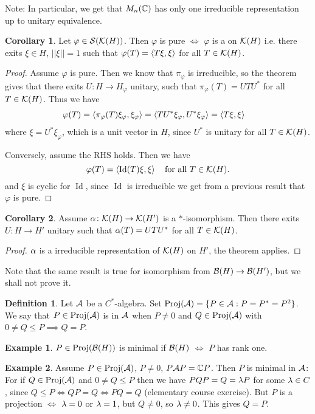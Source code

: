 \documentclass[10pt,english,a4paper]{article}
\theoremstyle{definition}
\newtheorem*{definition}{Definition}
\newtheorem*{corollary}{Corollary}
\newtheorem*{example}{Example}
\let\emph\relax %
\def\pivp{\pi_{\vphi}}
\def\Hvp{H_{\vphi}}
\def\xivp{\xi_{\vphi}}
\DeclareMathOperator{\Proj}{Proj}
\DeclareMathOperator{\Id}{Id}
\def\vphi{\varphi}
\begin{document}
Note: In particular, we get that $M_n(\mathbb{C})$ has only one irreducible representation 
up to unitary equivalence. 


\begin{corollary}
    Let $\varphi \in \mathcal{S}(\mathcal{K}(H))$. Then $\vphi$ is pure $\iff$ $\vphi$ is a \emph{vector state}
on $\mathcal{K}(H)$ i.e. there exits $\xi \in H$, $||\xi||=1$ such that $\vphi(T) = \ind{T\xi,\xi}$
for all $T \in \mathcal{K}(H)$.
\end{corollary}
\begin{proof}
    Assume $\vphi$ is pure. Then we know that $\pi_{\vphi}$ is irreducible, so the 
theorem gives that there exits $U\colon H\to \Hvp$ unitary, such that 
$\pivp (T) = UTU^*$ for all $T \in \mathcal{K}(H)$.
Thus we have 
\begin{align*}
    \vphi(T) &= \ind{\pivp(T)\xivp, \xivp} = \ind{TU^*\xivp, U^*\xivp} = 
\ind{T\xi, \xi}
\end{align*}
where $\xi = U^*\xivp$, which is a unit vector in $H$, since $U^*$ is unitary
for all $T\in \mathcal{K}(H)$. 

Conversely, assume the RHS holds. Then we have 
\[ \vphi(T) = \ind{\Id(T)\xi,\xi}\quad\text{for all } T \in \Ks(H).\]
and $\xi$ is cyclic for $\Id$, since $\Id$ is irreducible we get from a
previous result that $\vphi$ is pure.
\end{proof}

\begin{corollary}
    Assume $\alpha\colon \mathcal{K}(H)\to \mathcal{K}(H')$ is a $*$-isomorphism. Then there exits 
$U\colon H\to H'$ unitary such that 
$\alpha(T) = UTU^*$ for all $T \in \mathcal{K}(H)$.
\end{corollary}
\begin{proof}
    $\alpha$ is a irreducible representation of $\mathcal{K}(H)$ on $H'$, the theorem applies. 
\end{proof}

Note that the same result is true for isomorphism from $\mathcal{B}(H)\to \mathcal{B}(H')$, 
but we shall not prove it. 

\begin{definition}
Let $\mathcal{A}$ be a $C^*$-algebra. Set $\Proj(\As) =\{P\in \As: P=P^*=P^2\}$.
We say that $P\in \Proj(\As)$ is \emph{minimal} in $\mathcal{A}$ when $P\neq 0$
and $Q \in \Proj(\As)$ with $0\neq Q \leq P \implies Q = P$.
\end{definition}

\begin{example}
    $P\in \Proj(\Bs(H))$ is minimal if $\mathcal{B}(H)$ $\iff$ $P$ has rank one.
\end{example}
\begin{example}
    Assume $P\in \Proj(\As)$, $P\neq 0$, $P\mathcal{A} P = \mathbb{C} P$. Then $P$ is minimal 
in $\mathcal{A}$: For if $Q \in \Proj(\As)$ and $0\neq Q\leq P$ then we have $PQP = Q =\lambda P$
for some $\lambda \in C$, since $Q\leq P \iff QP =Q \iff PQ =Q$ (elementary course exercise).
But $P$ is a projection $\iff$ $\lambda = 0$ or $\lambda =1$, but $Q\neq 0$, so $\lambda \neq 0$. This gives 
$Q = P$.
\end{example}
\end{document}

